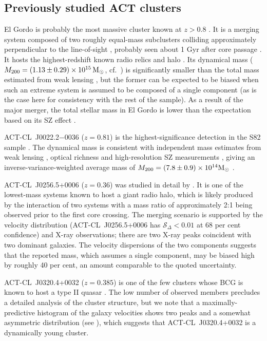 \subsection{Previously studied ACT clusters}
\label{s:previous}

El Gordo \citep[ACT-CL~J0102$-$4915, $z=0.87$,][]{menanteau12} is probably the most massive cluster known at $z>0.8$ \citep{jee14_gordo}. It is a merging system composed of two roughly equal-mass subclusters colliding approximately perpendicular to the line-of-sight \citep{zitrin13,jee14_gordo}, probably seen about 1 Gyr after core passage \citep{ng15}. It hosts the highest-redshift known radio relics and halo \citep{lindner14}. Its dynamical mass ($M_{200}=(1.13\pm0.29)\times10^{15}\,{\rm M}_\odot$, cf.\ ) is significantly smaller than the total mass estimated from weak lensing \citep[$M_{200}=(2.84\pm0.51)\times10^{15}\,\Msun$,][]{jee14_gordo}, but the former can be expected to be biased when such an extreme system is assumed to be composed of a single component (as is the case here for consistency with the rest of the sample). As a result of the major merger, the total stellar mass in El Gordo is lower than the expectation based on its SZ effect \citep{hilton13}.

ACT-CL~J0022.2$-$0036 ($z=0.81$) is the highest-significance detection in the S82 sample \citep{hasselfield13}. The dynamical mass is consistent with independent mass estimates from weak lensing \citep{miyatake13}, optical richness and high-resolution SZ measurements \citep{reese12}, giving an inverse-variance-weighted average mass of $M_{200}=(7.8\pm0.9)\times10^{14}{\rm M}_\odot$ \citep[see also the discussion in][]{menanteau13}.

ACT-CL~J0256.5+0006 ($z=0.36$) was studied in detail by \cite{knowles16}. It is one of the lowest-mass systems known to host a giant radio halo, which is likely produced by the interaction of two systems with a mass ratio of approximately 2:1 being observed prior to the first core crossing. The merging scenario is supported by the velocity distribution (ACT-CL~J0256.5+0006 has $\mathcal{S}_\Delta<0.01$ at 68 per cent confidence) and X-ray observations; there are two X-ray peaks coincident with two dominant galaxies. The velocity dispersions of the two components suggests that the reported mass, which assumes a single component, may be biased high by roughly 40 per cent, an amount comparable to the quoted uncertainty.

ACT-CL~J0320.4+0032 ($z=0.385$) is one of the few clusters whose BCG is known to host a type II quasar \citep{kirk15}. The low number of observed members precludes a detailed analysis of the cluster structure, but we note that a maximally-predictive histogram \citep{knuth06} of the galaxy velocities shows two peaks and a somewhat asymmetric distribution (see ), which suggests that ACT-CL~J0320.4+0032 is a dynamically young cluster.

